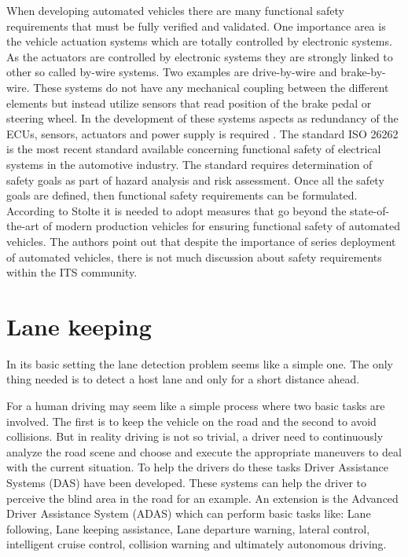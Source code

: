 When developing automated vehicles there are many functional safety requirements that must be fully verified and validated. One importance area is the vehicle actuation systems which are totally controlled by electronic systems. As the actuators are controlled by electronic systems they are strongly linked to other so called by-wire systems. Two examples are drive-by-wire and brake-by-wire. These systems do not have any mechanical coupling between the different elements but instead utilize sensors that read position of the brake pedal or steering wheel. In the development of these systems aspects as redundancy of the ECUs, sensors, actuators and power supply is required \cite{stolte2016safety}. 	The standard ISO 26262 is the most recent standard available concerning functional safety of electrical systems in the automotive industry. The standard requires determination of safety goals as part of hazard analysis and risk assessment. Once all the safety goals are defined, then functional safety requirements can be formulated.\\

According to Stolte \cite{stolte2016safety} it is needed to adopt measures that go beyond the state-of-the-art of modern production vehicles for ensuring functional safety of automated vehicles. The authors point out that despite the importance of series deployment of automated vehicles, there is not much discussion about safety requirements within the ITS community.  


\section{Lane keeping}
In its basic setting the lane detection problem seems like a simple one. The only thing needed is to detect a host lane and only for a short distance ahead.

For a human driving may seem like a simple process where two basic tasks are involved. The first is to keep the vehicle on the road and the second to avoid collisions. But in reality driving is not so trivial, a driver need to continuously analyze the road scene and choose and execute the appropriate maneuvers to deal with the current situation. To help the drivers do these tasks Driver Assistance Systems (DAS) have been developed. These systems can help the driver to perceive the blind area in the road for an example. An extension is the Advanced Driver Assistance System (ADAS) which can perform basic tasks like: Lane following, Lane keeping assistance, Lane departure warning, lateral control, intelligent cruise control, collision warning and ultimately autonomous driving.\\

